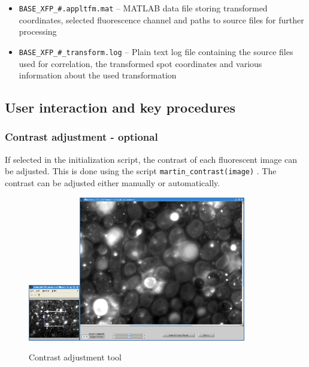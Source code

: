 \documentclass[10pt,a4paper,onepage,DIV12]{scrartcl}
\begin{document}
\begin{itemize}
\item \texttt{BASE\_XFP\_\#.appltfm.mat} -- MATLAB data file storing transformed coordinates, selected fluorescence channel and paths to source files for further processing
\item \texttt{BASE\_XFP\_\#\_transform.log} -- Plain text log file containing the source files used for correlation, the transformed spot coordinates and various information about the used transformation
\end{itemize}

\newpage
\subsection{User interaction and key procedures}
\subsubsection{Contrast adjustment - optional}
If selected in the initialization script, the contrast of each fluorescent image can be adjusted. This is done using the script \verb|martin_contrast(image)| . The contrast can be adjusted either manually or automatically.
\begin{figure}
 \centering
 \includegraphics[width=0.2\textwidth]{images/contr_overview.jpg}\includegraphics[width=0.65\textwidth]{images/contr.jpg}
 \caption{Contrast adjustment tool}
 \label{fig:contrast}
\end{figure}
\end{document}
